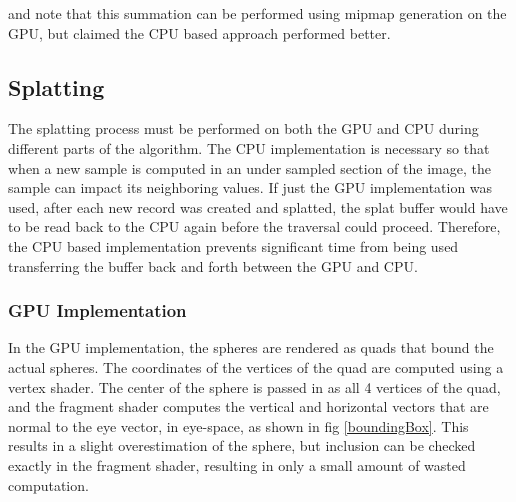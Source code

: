 \documentclass[10pt,twopage]{acmsiggraph}
\begin{document}
\cite{mainpaper} and \cite{larsen2004simulating} note that this summation can be performed using mipmap generation on the GPU, but \cite{mainpaper} claimed the CPU based approach performed better.

\subsection{Splatting}
The splatting process must be performed on both the GPU and CPU during different parts of the algorithm.  The CPU implementation is necessary so that when a new sample is computed in an under sampled section of the image, the sample can impact its neighboring values.  If just the GPU implementation was used, after each new record was created and splatted, the splat buffer would have to be read back to the CPU again before the traversal could proceed.  Therefore, the CPU based implementation prevents significant time from being used transferring the buffer back and forth between the GPU and CPU.

\subsubsection{GPU Implementation}
In the GPU implementation, the spheres are rendered as quads that bound the actual spheres.  The coordinates of the vertices of the quad are computed using a vertex shader.  The center of the sphere is passed in as all 4 vertices of the quad, and the fragment shader computes the vertical and horizontal vectors that are normal to the eye vector, in eye-space, as shown in fig \ref{boundingBox}.  This results in a slight overestimation of the sphere, but inclusion can be checked exactly in the fragment shader, resulting in only a small amount of wasted computation.  
\end{document}
